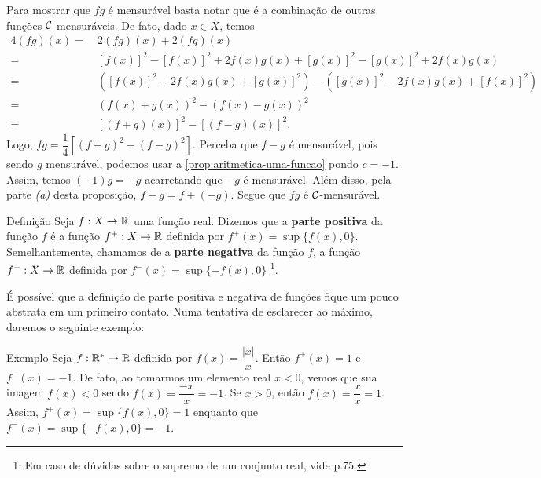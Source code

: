 \begin{prova}
    Para mostrar que $fg$ é mensurável basta notar que é a combinação de outras funções $\operatorname{\mathcal{C}}$-mensuráveis.
    De fato, dado $x \in X$, temos
    	\vspace{-0.2cm}
	    \begin{align*}
	        4(fg)(x) 
	        =& \ 2(fg)(x) +  2(fg)(x)\\
	        =& \ [f(x)]^2 - [f(x)]^2 + 2f(x)g(x) + [g(x)]^2 - [g(x)]^2 + 2f(x)g(x)\\
	        =& \ \left([f(x)]^2 + 2f(x)g(x) + [g(x)]^2\right)  - \left([g(x)]^2 - 2f(x)g(x) + [f(x)]^2\right)\\
	        =& \ (f(x) +g(x))^2 - (f(x) - g(x))^2\\
	        =& \ [(f+g)(x)]^2 - [(f-g)(x)]^2.    
    	\end{align*}
    \vspace{-0.2cm}
    Logo, $fg = \dfrac{1}{4}\left[(f+g)^2 - (f-g)^2\right]$.
    Perceba que  $f-g$ é mensurável, pois sendo $g$ mensurável, podemos usar a \ref{prop:aritmetica-uma-funcao} pondo $c= -1$.
    Assim, temos $(-1)g = -g$ acarretando que $-g$ é mensurável.
    Além disso, pela parte \textit{(a)} desta proposição, $f - g = f+ (-g)$.
    Segue que $fg$ é $\operatorname{\mathcal{C}}$-mensurável.
\end{prova}
\begin{env}{Definição}
	\label{def:parte-positiva e negativa}
    Seja $f: X \to \mathbb{R}$ uma função real. Dizemos que a \textbf{parte positiva} da função $f$ é a função $f^+: X \to \mathbb{R}$ definida por $f^+(x) = \sup\{f(x), 0\}$.
    Semelhantemente, chamamos de a \textbf{parte negativa} da função $f$, a função $f^-: X \to \mathbb{R}$ definida por $f^-(x) = \sup\{-f(x), 0\}$
    \footnote{Em caso de dúvidas sobre o supremo de um conjunto real, vide \supercite{elon}{p.75}.}.
\vspace{-0.2cm}\end{env}

É possível  que a definição de parte positiva e negativa de funções fique um pouco abstrata em um primeiro contato. 
Numa tentativa de esclarecer ao máximo, daremos o seguinte exemplo:
\begin{env}{Exemplo}
	\label{ex:parte-positiva e negativa}
    Seja $f: \mathbb{R}^* \to \mathbb{R}$ definida por $f(x) =\dfrac{|x|}{x}$. 
    Então $f^+(x) = 1$ e $f^-(x) = -1$.
    De fato, ao tomarmos um elemento real $x< 0$, vemos que sua imagem $f(x) < 0$ sendo $f(x) = \dfrac{-x}{x} = -1$.
    Se $x>0$, então $f(x) =\dfrac{x}{x} = 1$. 
    Assim, $f^+(x) = \sup\{f(x), 0\} = 1$ enquanto que $f^-(x) = \sup\{-f(x), 0\} = -1$.
\vspace{-0.2cm}\end{env}

